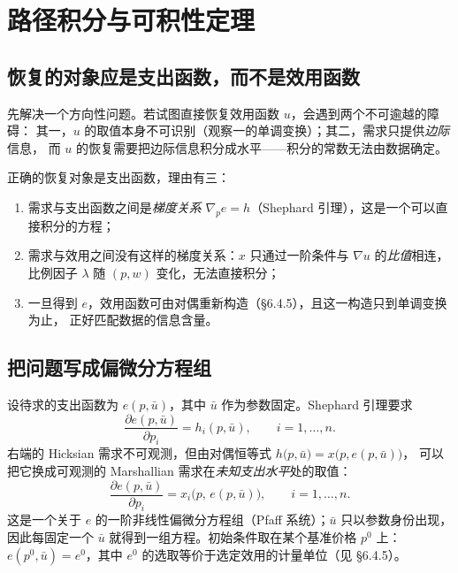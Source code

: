 \section{路径积分与可积性定理}

\subsection{恢复的对象应是支出函数，而不是效用函数}

先解决一个方向性问题。若试图直接恢复效用函数 $u$，会遇到两个不可逾越的障碍：
其一，$u$ 的取值本身不可识别（观察一的单调变换）；其二，需求只提供\emph{边际}信息，
而 $u$ 的恢复需要把边际信息积分成水平——积分的常数无法由数据确定。

正确的恢复对象是支出函数，理由有三：
\begin{enumerate}
\item 需求与支出函数之间是\emph{梯度关系} $\nabla_pe=h$（Shephard 引理），这是一个可以直接积分的方程；
\item 需求与效用之间没有这样的梯度关系：$x$ 只通过一阶条件与 $\nabla u$ 的\emph{比值}相连，
      比例因子 $\lambda$ 随 $(p,w)$ 变化，无法直接积分；
\item 一旦得到 $e$，效用函数可由对偶重新构造（\S 6.4.5），且这一构造只到单调变换为止，
      正好匹配数据的信息含量。
\end{enumerate}

\subsection{把问题写成偏微分方程组}

设待求的支出函数为 $e(p,\bar u)$，其中 $\bar u$ 作为参数固定。Shephard 引理要求
\[
 \frac{\partial e(p,\bar u)}{\partial p_i}=h_i(p,\bar u),\qquad i=1,\ldots,n.
\]
右端的 Hicksian 需求不可观测，但由对偶恒等式 $h\bigl(p,\bar u\bigr)=x\bigl(p,e(p,\bar u)\bigr)$，
可以把它换成可观测的 Marshallian 需求在\emph{未知支出水平}处的取值：
\begin{equation}\label{eq:pfaff}
 \boxed{\;\frac{\partial e(p,\bar u)}{\partial p_i}
 =x_i\bigl(p,\,e(p,\bar u)\bigr),\qquad i=1,\ldots,n.\;}
\end{equation}
这是一个关于 $e$ 的一阶非线性偏微分方程组（Pfaff 系统）；$\bar u$ 只以参数身份出现，
因此每固定一个 $\bar u$ 就得到一组方程。初始条件取在某个基准价格 $p^0$ 上：
$e(p^0,\bar u)=e^0$，其中 $e^0$ 的选取等价于选定效用的计量单位（见 \S 6.4.5）。


